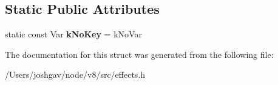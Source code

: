 \subsection*{Static Public Attributes}
\begin{DoxyCompactItemize}
\item 
static const Var {\bfseries k\+No\+Key} = k\+No\+Var\hypertarget{structv8_1_1internal_1_1_effects_base_1_1_splay_tree_config_a082d5b7800fc46e7001c0ee335838b37}{}\label{structv8_1_1internal_1_1_effects_base_1_1_splay_tree_config_a082d5b7800fc46e7001c0ee335838b37}

\end{DoxyCompactItemize}


The documentation for this struct was generated from the following file\+:\begin{DoxyCompactItemize}
\item 
/\+Users/joshgav/node/v8/src/effects.\+h\end{DoxyCompactItemize}
